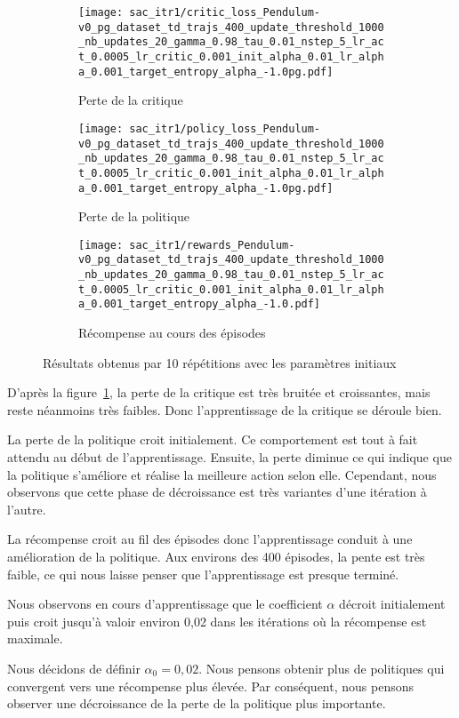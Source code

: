 \begin{figure}[H]
    \centering
    \begin{subfigure}{0.30\textwidth}
        \texttt{[image: sac\_itr1/critic\_loss\_Pendulum-v0\_pg\_dataset\_td\_trajs\_400\_update\_threshold\_1000\_nb\_updates\_20\_gamma\_0.98\_tau\_0.01\_nstep\_5\_lr\_act\_0.0005\_lr\_critic\_0.001\_init\_alpha\_0.01\_lr\_alpha\_0.001\_target\_entropy\_alpha\_-1.0pg.pdf]}
        \caption{Perte de la critique}
    \end{subfigure}
    \begin{subfigure}{0.30\textwidth}
        \texttt{[image: sac\_itr1/policy\_loss\_Pendulum-v0\_pg\_dataset\_td\_trajs\_400\_update\_threshold\_1000\_nb\_updates\_20\_gamma\_0.98\_tau\_0.01\_nstep\_5\_lr\_act\_0.0005\_lr\_critic\_0.001\_init\_alpha\_0.01\_lr\_alpha\_0.001\_target\_entropy\_alpha\_-1.0pg.pdf]}
        \caption{Perte de la politique}
    \end{subfigure}
    \begin{subfigure}{0.30\textwidth}
        \texttt{[image: sac\_itr1/rewards\_Pendulum-v0\_pg\_dataset\_td\_trajs\_400\_update\_threshold\_1000\_nb\_updates\_20\_gamma\_0.98\_tau\_0.01\_nstep\_5\_lr\_act\_0.0005\_lr\_critic\_0.001\_init\_alpha\_0.01\_lr\_alpha\_0.001\_target\_entropy\_alpha\_-1.0.pdf]}
        \caption{Récompense au cours des épisodes}
    \end{subfigure}
    \caption{Résultats obtenus par 10 répétitions avec les paramètres initiaux}\label{fig:sac:results}
\end{figure}

D'après la figure~\ref{fig:sac:results}, la perte de la critique est très bruitée et croissantes, mais reste néanmoins très faibles. Donc
l'apprentissage de la critique se déroule bien.

La perte de la politique croit initialement. Ce comportement est tout à fait
attendu au début de l'apprentissage. Ensuite, la perte diminue ce qui indique
que la politique s'améliore et réalise la meilleure action selon elle.
Cependant, nous observons que cette phase de décroissance est très variantes
d'une itération à l'autre.

La récompense croit au fil des épisodes donc l'apprentissage conduit à une
amélioration de la politique. Aux environs des 400 épisodes, la pente est très
faible, ce qui nous laisse penser que l'apprentissage est presque terminé.

Nous observons en cours d'apprentissage que le coefficient \(\alpha\) décroit
initialement puis croit jusqu'à valoir environ 0,02 dans les itérations où la
récompense est maximale.

Nous décidons de définir \(\alpha_{0}=0,02\). Nous pensons obtenir plus de
politiques qui convergent vers une récompense plus élevée. Par conséquent, nous
pensons observer une décroissance de la perte de la politique plus importante.
